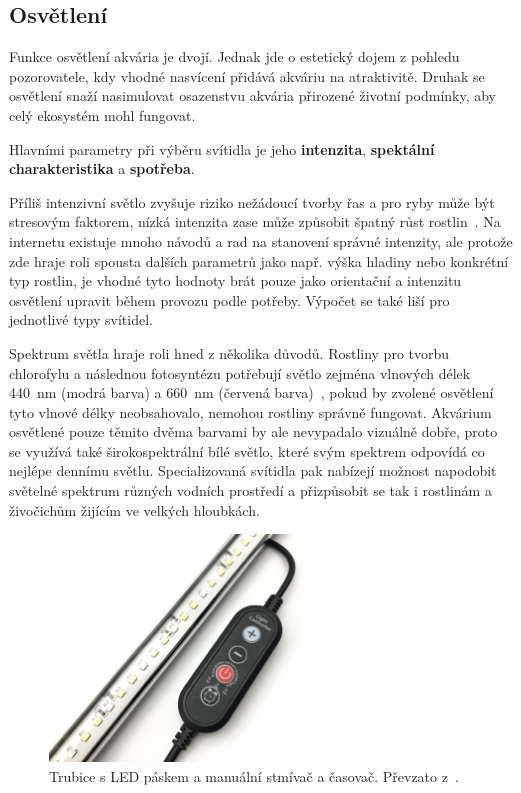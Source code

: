     \subsection{Osvětlení}
        Funkce osvětlení akvária je dvojí. Jednak jde o estetický dojem z pohledu pozorovatele, kdy vhodné nasvícení přidává akváriu na atraktivitě. Druhak se osvětlení snaží nasimulovat osazenstvu akvária přirozené životní podmínky, aby celý ekosystém mohl fungovat.

        Hlavními parametry při výběru svítidla je jeho \textbf{intenzita}, \textbf{spektální charakteristika} a \textbf{spotřeba}. 
        
        Příliš intenzivní světlo zvyšuje riziko nežádoucí tvorby řas a pro ryby může být stresovým faktorem, nízká intenzita zase může způsobit špatný růst rostlin~\cite{KejzlarRadim2022Ařpa}. Na internetu existuje mnoho návodů a rad na stanovení správné intenzity, ale protože zde hraje roli spousta dalších parametrů jako např. výška hladiny nebo konkrétní typ rostlin, je vhodné tyto hodnoty brát pouze jako orientační a intenzitu osvětlení upravit během provozu podle potřeby. Výpočet se také liší pro jednotlivé typy svítidel. 

        Spektrum světla hraje roli hned z několika důvodů. Rostliny pro tvorbu chlorofylu a následnou fotosyntézu potřebují světlo zejména vlnových délek \qty{440}{nm} (modrá barva) a \qty{660}{nm} (červená barva)~\cite{eshop-ledsolution-svetlo}, pokud by zvolené osvětlení tyto vlnové délky neobsahovalo, nemohou rostliny správně fungovat. Akvárium osvětlené pouze těmito dvěma barvami by ale nevypadalo vizuálně dobře, proto se využívá také širokospektrální bílé světlo, které svým spektrem odpovídá co nejlépe dennímu světlu. 
        Specializovaná svítidla pak nabízejí možnost napodobit světelné spektrum různých vodních prostředí a přizpůsobit se tak i rostlinám a živočichům žijícím ve velkých hloubkách. 

 
        \begin{figure}[h!]
            \centering
            \includegraphics[width=0.6\textwidth]{obrazky/osvetleni/stmivac.jpg}
            \caption{Trubice s LED páskem a manuální stmívač a časovač. Převzato z~\cite{eshop-rostlinna-akvaria}.}
            \label{fig:obrazky-osvetleni-stmivac-jpg}
        \end{figure}

